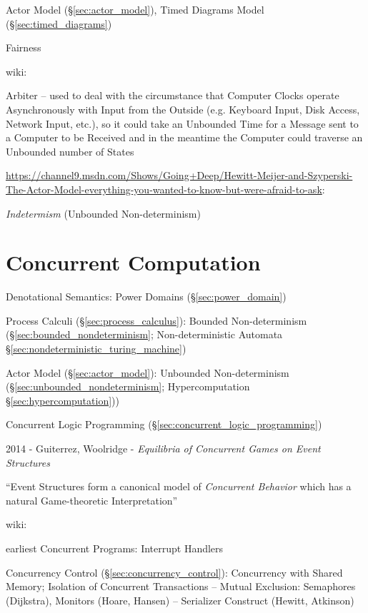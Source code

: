 \fist Actor Model (\S\ref{sec:actor_model}), Timed Diagrams Model
(\S\ref{sec:timed_diagrams})

Fairness

wiki:

Arbiter -- used to deal with the circumstance that Computer Clocks
operate Asynchronously with Input from the Outside (e.g. Keyboard
Input, Disk Access, Network Input, etc.), so it could take an
Unbounded Time for a Message sent to a Computer to be Received and in
the meantime the Computer could traverse an Unbounded number of States


\url{https://channel9.msdn.com/Shows/Going+Deep/Hewitt-Meijer-and-Szyperski-The-Actor-Model-everything-you-wanted-to-know-but-were-afraid-to-ask}:

\emph{Indetermism} (Unbounded Non-determinism)



\section{Concurrent Computation}\label{sec:concurrent_computation}

Denotational Semantics: Power Domains (\S\ref{sec:power_domain})

\fist Process Calculi (\S\ref{sec:process_calculus}): Bounded
Non-determinism (\S\ref{sec:bounded_nondeterminism}; \fist
Non-deterministic Automata \S\ref{sec:nondeterministic_turing_machine})

\fist Actor Model (\S\ref{sec:actor_model}): Unbounded Non-determinism
(\S\ref{sec:unbounded_nondeterminism}; \fist Hypercomputation
\S\ref{sec:hypercomputation}))

\fist Concurrent Logic Programming (\S\ref{sec:concurrent_logic_programming})

2014 - Guiterrez, Woolridge - \emph{Equilibria of Concurrent Games on Event
  Structures}

``Event Structures form a canonical model of \emph{Concurrent Behavior} which
has a natural Game-theoretic Interpretation''

wiki:

earliest Concurrent Programs: Interrupt Handlers %

Concurrency Control (\S\ref{sec:concurrency_control}): Concurrency
with Shared Memory; Isolation of Concurrent Transactions -- Mutual
Exclusion: Semaphores (Dijkstra), Monitors (Hoare, Hansen) --
Serializer Construct (Hewitt, Atkinson)




